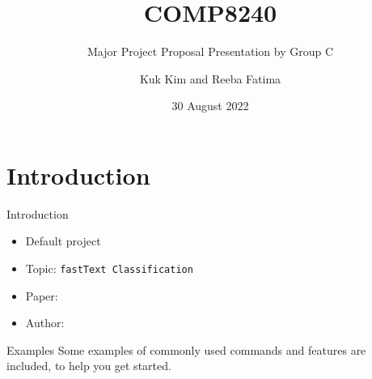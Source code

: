 \documentclass[10pt,xcolor={table,dvipsnames},t]{beamer}
\title[Your Short Title]{COMP8240}
\subtitle{Major Project Proposal Presentation by Group C}
\author{Kuk Kim and Reeba Fatima}
\date{30 August 2022}
\begin{document}
\begin{frame}
  \titlepage
\end{frame}


\section{Introduction}
\begin{frame}{Introduction}

\begin{itemize}
  \item Default project
  \item Topic: \texttt{fastText Classification}
  \item Paper: 
  \item Author: 
\end{itemize}

\begin{block}{Examples}
Some examples of commonly used commands and features are included, to help you get started.
\end{block}

\end{frame}

\end{document}
